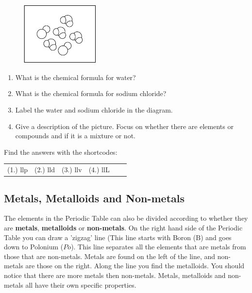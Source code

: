 \begin{enumerate}[noitemsep, label=\textbf{\arabic*}. ]
    \setcounter{subfigure}{0}
	\begin{figure}[H] %
    \begin{center}
    \label{m38708*id65419!!!underscore!!!media}\label{m38708*id65419!!!underscore!!!printimage}\includegraphics[width=4cm]{col11305.imgs/m38708_CG10C1_004.png} %
      \vspace{2pt}
    \vspace{.1in}
    \end{center}
 \end{figure}       \label{m38708*id65426}\begin{enumerate}[noitemsep, label=\textbf{\alph*}. ] 
            \label{m38708*uid64}\item What is the chemical formula for water?
\label{m38708*uid65}\item What is the chemical formula for sodium chloride?
\label{m38708*uid66}\item Label the water and sodium chloride in the diagram.
\label{m38708*uid67}\item Give a description of the picture. Focus on whether there are elements or compounds and if it is a mixture or not.
\end{enumerate}
\end{enumerate}
    \label{m38708*cid5}
\par {} Find the answers with the shortcodes:
 \par \begin{tabular}[h]{cccccc}
 (1.) llp  &  (2.) lld  &  (3.) llv  &  (4.) llL  & \end{tabular}
            \subsection{ Metals, Metalloids and Non-metals}
            \nopagebreak
      \label{m38708*id65693}The elements in the Periodic Table can also be divided according to whether they are \textbf{metals}, \textbf{metalloids} or \textbf{non-metals}. On the right hand side of the Periodic Table you can draw a 'zigzag' line (This line starts with Boron ($\mathrm{B}$) and goes down to Polonium ($Po$). This line separates all the elements that are metals from those that are non-metals. Metals are found on the left of the line, and non-metals are those on the right. Along the line you find the metalloids. You should notice that there are more metals then non-metals. Metals, metalloids and non-metals all have their own specific properties.\par 
      \label{m38708*uid76}
